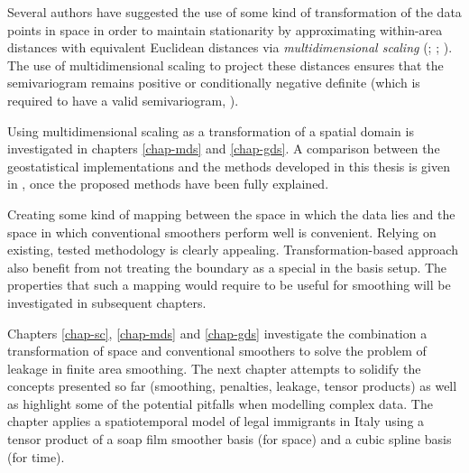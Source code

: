 \begin{enumerate}
Several authors have suggested the use of some kind of transformation of the data points in space in order to maintain stationarity by approximating within-area distances with equivalent Euclidean distances via \textit{multidimensional scaling} (\cite{mdskrig}; \cite{crabkrig}; \cite{curriero}). The use of multidimensional scaling to project these distances ensures that the semivariogram remains positive or conditionally negative definite (which is required to have a valid semivariogram, ).


Using multidimensional scaling as a transformation of a spatial domain is investigated in chapters  \ref{chap-mds} and \ref{chap-gds}. A comparison between the geostatistical implementations and the methods developed in this thesis is given in , once the proposed methods have been fully explained.
\end{enumerate}

Creating some kind of mapping between the space in which the data lies and the space in which conventional smoothers perform well is convenient. Relying on existing, tested methodology is clearly appealing. Transformation-based approach also benefit from not treating the boundary as a special in the basis setup. The properties that such a mapping would require to be useful for smoothing will be investigated in subsequent chapters.

Chapters \ref{chap-sc}, \ref{chap-mds} and \ref{chap-gds} investigate the combination a transformation of space and conventional smoothers to solve the problem of leakage in finite area smoothing. The next chapter attempts to solidify the concepts presented so far (smoothing, penalties, leakage, tensor products) as well as highlight some of the potential pitfalls when modelling complex data. The chapter applies a spatiotemporal model of legal immigrants in Italy using a tensor product of a soap film smoother basis (for space) and a cubic spline basis (for time).